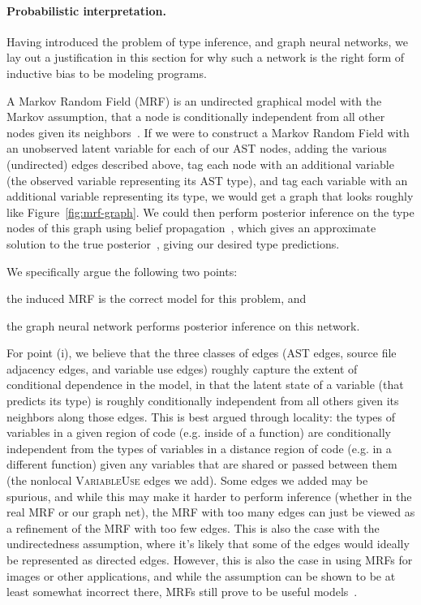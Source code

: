 
\paragraph{Probabilistic interpretation.}
Having introduced the problem of type inference, and graph neural networks, we lay out a justification in this section for why such a network is the right form of inductive bias to be modeling programs.

A Markov Random Field (MRF) is an undirected graphical model with the Markov assumption, that a node is conditionally independent from all other nodes given its neighbors~\cite{kinderman80markov}.
If we were to construct a Markov Random Field with an unobserved latent variable for each of our AST nodes, adding the various (undirected) edges described above, tag each node with an additional variable (the observed variable representing its AST type), and tag each variable with an additional variable representing its type, we would get a graph that looks roughly like Figure~\ref{fig:mrf-graph}.
We could then perform posterior inference on the type nodes of this graph using belief propagation~\cite{pearl2009causality}, which gives an approximate solution to the true posterior~\cite{weiss2000correctness}, giving our desired type predictions.

We specifically argue the following two points:
\begin{enumerate*}[label=(\roman*)]
	\item the induced MRF is the correct model for this problem, and
	\item the graph neural network performs posterior inference on this network.
\end{enumerate*}

For point (i), we believe that the three classes of edges (AST edges, source file adjacency edges, and variable use edges) roughly capture the extent of conditional dependence in the model, in that the latent state of a variable (that predicts its type) is roughly conditionally independent from all others given its neighbors along those edges.
This is best argued through locality: the types of variables in a given region of code (e.g. inside of a function) are conditionally independent from the types of variables in a distance region of code (e.g. in a different function) given any variables that are shared or passed between them (the nonlocal \textsc{VariableUse} edges we add).
Some edges we added may be spurious, and while this may make it harder to perform inference (whether in the real MRF or our graph net), the MRF with too many edges can just be viewed as a refinement of the MRF with too few edges.
This is also the case with the undirectedness assumption, where it's likely that some of the edges would ideally be represented as directed edges.
However, this is also the case in using MRFs for images or other applications, and while the assumption can be shown to be at least somewhat incorrect there, MRFs still prove to be useful models~\cite{rangarajan95markov}.

